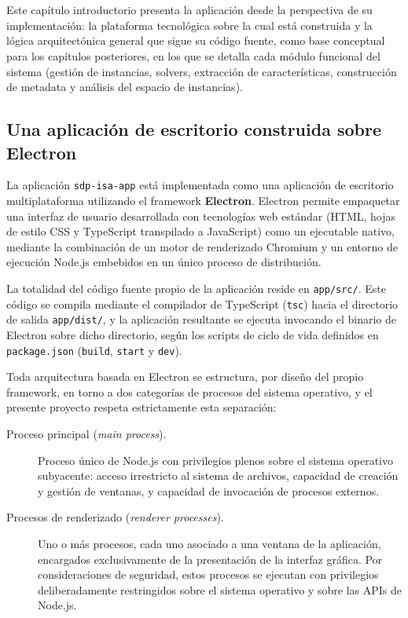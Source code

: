 \chapter{}
\label{cap:1}

Este cap\'itulo introductorio presenta la aplicaci\'on desde la perspectiva
de su implementaci\'on: la plataforma tecnol\'ogica sobre la cual est\'a
construida y la l\'ogica arquitect\'onica general que sigue su c\'odigo
fuente, como base conceptual para los cap\'itulos posteriores, en los que se
detalla cada m\'odulo funcional del sistema (gesti\'on de instancias,
solvers, extracci\'on de caracter\'isticas, construcci\'on de metadata y
an\'alisis del espacio de instancias).

\section{Una aplicaci\'on de escritorio construida sobre Electron}

La aplicaci\'on \texttt{sdp-isa-app} est\'a implementada como una
aplicaci\'on de escritorio multiplataforma utilizando el framework
\textbf{Electron}. Electron permite empaquetar una interfaz de usuario
desarrollada con tecnolog\'ias web est\'andar (HTML, hojas de estilo CSS y
TypeScript transpilado a JavaScript) como un ejecutable nativo, mediante la
combinaci\'on de un motor de renderizado Chromium y un entorno de ejecuci\'on
Node.js embebidos en un \'unico proceso de distribuci\'on.

La totalidad del c\'odigo fuente propio de la aplicaci\'on reside en
\texttt{app/src/}. Este c\'odigo se compila mediante el compilador de
TypeScript (\texttt{tsc}) hacia el directorio de salida \texttt{app/dist/},
y la aplicaci\'on resultante se ejecuta invocando el binario de Electron
sobre dicho directorio, seg\'un los scripts de ciclo de vida definidos en
\texttt{package.json} (\texttt{build}, \texttt{start} y \texttt{dev}).

Toda arquitectura basada en Electron se estructura, por dise\~no del propio
framework, en torno a dos categor\'ias de procesos del sistema operativo, y
el presente proyecto respeta estrictamente esta separaci\'on:

\begin{description}
    \item[Proceso principal (\emph{main process}).] Proceso \'unico de
    Node.js con privilegios plenos sobre el sistema operativo subyacente:
    acceso irrestricto al sistema de archivos, capacidad de creaci\'on y
    gesti\'on de ventanas, y capacidad de invocaci\'on de procesos externos.

    \item[Procesos de renderizado (\emph{renderer processes}).] Uno o m\'as
    procesos, cada uno asociado a una ventana de la aplicaci\'on, encargados
    exclusivamente de la presentaci\'on de la interfaz gr\'afica. Por
    consideraciones de seguridad, estos procesos se ejecutan con privilegios
    deliberadamente restringidos sobre el sistema operativo y sobre las APIs
    de Node.js.
\end{description}

